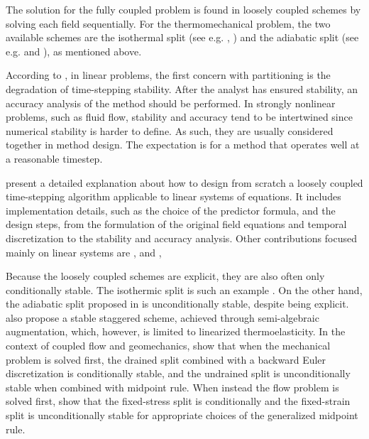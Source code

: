 The solution for the fully coupled problem is found in loosely coupled schemes by solving each field sequentially.
For the thermomechanical problem, the two available schemes are the isothermal split (see e.g. \cite{simo_recent_1992}, \cite{agelet_de_saracibar_numerical_1998}) and the adiabatic split (see e.g. \cite{armero_new_1992} and \cite{armero_priori_1993}), as mentioned above.

According to \cite{felippa_partitioned_2001}, in linear problems, the first concern with partitioning is the degradation of time-stepping stability.
After the analyst has ensured stability, an accuracy analysis of the method should be performed.
In strongly nonlinear problems, such as fluid flow, stability and accuracy tend to be intertwined since numerical stability is harder to define.
As such, they are usually considered together in method design.
The expectation is for a method that operates well at a reasonable timestep.

\cite{felippa_partitioned_1988} present a detailed explanation about how to design from scratch a loosely coupled time-stepping algorithm applicable to linear systems of equations.
It includes implementation details, such as the choice of the predictor formula, and the design steps, from the formulation of the original field equations and temporal discretization to the stability and accuracy analysis.
Other contributions focused mainly on linear systems are \cite{neishlos_finite-element_1983}, \cite{zienkiewicz_unconditionally_1988} and \cite{combescure_numerical_2002},

Because the loosely coupled schemes are explicit, they are also often only conditionally stable.
The isothermic split is such an example \citep{armero_new_1992}.
On the other hand, the adiabatic split proposed in \cite{armero_new_1992} is unconditionally stable, despite being explicit.
\cite{farhat_unconditionally_1991} also propose a stable staggered scheme, achieved through semi-algebraic augmentation, which, however, is limited to linearized thermoelasticity.
In the context of coupled flow and geomechanics, \cite{kim_stability_2011-2} show that when the mechanical problem is solved first, the drained split combined with a backward Euler discretization is conditionally stable, and the undrained split is unconditionally stable when combined with midpoint rule.
When instead the flow problem is solved first, \cite{kim_stability_2011-1} show that the fixed-stress split is conditionally and the fixed-strain split is unconditionally stable for appropriate choices of the generalized midpoint rule.

